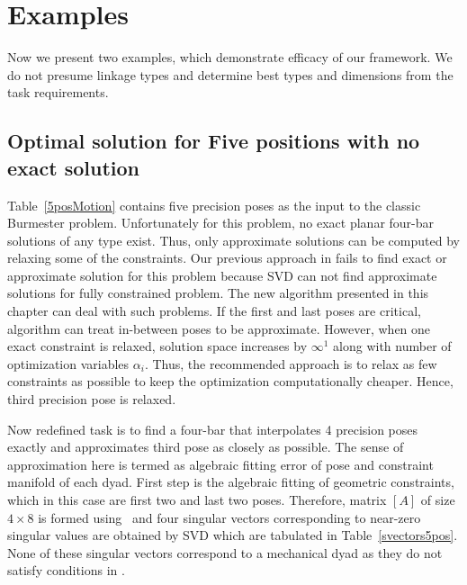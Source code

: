 \section{Examples}\label{examples}
Now we present two examples, which demonstrate efficacy of our framework. We do not presume linkage types and determine best types and dimensions from the task requirements.

\subsection{Optimal solution for Five positions with no exact solution} \label{5pos}
Table~\ref{5posMotion} contains five precision poses as the input to the classic Burmester problem. Unfortunately for this problem, no exact planar four-bar solutions of any type exist. Thus, only approximate solutions can be computed by relaxing some of the constraints. Our previous approach in \cite{generalfitting-JCISE} fails to find exact or approximate solution for this problem because SVD can not find approximate solutions for fully constrained problem. The new algorithm presented in this chapter can deal with such problems. If the first and last poses are critical, algorithm can treat in-between poses to be approximate. However, when one exact constraint is relaxed, solution space increases by $\infty^1$ along with number of optimization variables $\alpha_i$. Thus, the recommended approach is to relax as few constraints as possible to keep the optimization computationally cheaper. Hence, third precision pose is relaxed.

Now redefined task is to find a four-bar that interpolates 4 precision poses exactly and approximates third pose as closely as possible. The sense of approximation here is termed as algebraic fitting error of pose and constraint manifold of each dyad. First step is the algebraic fitting of geometric constraints, which in this case are first two and last two poses. Therefore, matrix $[A]$ of size $4\times8$ is formed using~ and four singular vectors corresponding to near-zero singular values are obtained by SVD which are tabulated in Table~\ref{svectors5pos}. None of these singular vectors correspond to a mechanical dyad as they do not satisfy conditions in .

